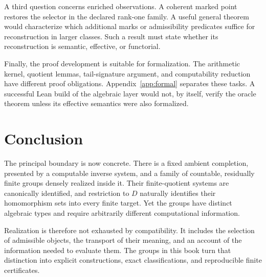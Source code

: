 A third question concerns enriched observations. A coherent marked point restores the selector in the declared rank-one family. A useful general theorem would characterize which additional marks or admissibility predicates suffice for reconstruction in larger classes. Such a result must state whether its reconstruction is semantic, effective, or functorial.

Finally, the proof development is suitable for formalization. The arithmetic kernel, quotient lemmas, tail-signature argument, and computability reduction have different proof obligations. Appendix~\ref{app:formal} separates these tasks. A successful Lean build of the algebraic layer would not, by itself, verify the oracle theorem unless its effective semantics were also formalized.

\section{Conclusion}
The principal boundary is now concrete. There is a fixed ambient completion, presented by a computable inverse system, and a family of countable, residually finite groups densely realized inside it. Their finite-quotient systems are canonically identified, and restriction to $D$ naturally identifies their homomorphism sets into every finite target. Yet the groups have distinct algebraic types and require arbitrarily different computational information.

Realization is therefore not exhausted by compatibility. It includes the selection of admissible objects, the transport of their meaning, and an account of the information needed to evaluate them. The groups in this book turn that distinction into explicit constructions, exact classifications, and reproducible finite certificates.

